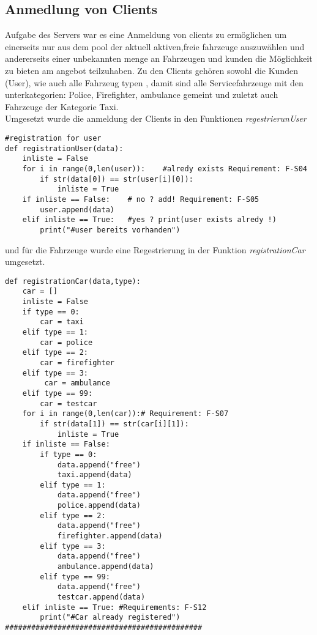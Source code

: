 \documentclass[conference]{IEEEtran}
\begin{document}
\subsection{Anmedlung von Clients}
Aufgabe des Servers war es eine Anmeldung von clients zu ermöglichen um  einerseits nur aus dem pool der aktuell aktiven,freie fahrzeuge  auszuwählen und andererseits einer unbekannten menge an Fahrzeugen und kunden die Möglichkeit zu bieten am angebot teilzuhaben. Zu den Clients gehören sowohl die Kunden (User), wie auch alle Fahrzeug typen , damit sind alle Servicefahrzeuge mit den unterkategorien: Police, Firefighter, ambulance gemeint und zuletzt auch Fahrzeuge der Kategorie Taxi.\\ 
Umgesetzt wurde die anmeldung der Clients in den Funktionen
\textit{regestrierunUser}
\begin{lstlisting}
#registration for user
def registrationUser(data):
    inliste = False
    for i in range(0,len(user)):    #alredy exists Requirement: F-S04
        if str(data[0]) == str(user[i][0]):
            inliste = True
    if inliste == False:    # no ? add! Requirement: F-S05
        user.append(data)
    elif inliste == True:   #yes ? print(user exists alredy !)
        print("#user bereits vorhanden")
\end{lstlisting}
und für die Fahrzeuge wurde eine Regestrierung in der Funktion \textit{registrationCar} umgesetzt.
\begin{lstlisting}
def registrationCar(data,type):
    car = []
    inliste = False
    if type == 0:
        car = taxi
    elif type == 1:
        car = police
    elif type == 2:
        car = firefighter
    elif type == 3:
         car = ambulance
    elif type == 99:
        car = testcar
    for i in range(0,len(car)):# Requirement: F-S07
        if str(data[1]) == str(car[i][1]):
            inliste = True
    if inliste == False:
        if type == 0:
            data.append("free")
            taxi.append(data)
        elif type == 1:
            data.append("free")
            police.append(data)
        elif type == 2:
            data.append("free")
            firefighter.append(data)
        elif type == 3:
            data.append("free")
            ambulance.append(data)
        elif type == 99:
            data.append("free")
            testcar.append(data)
    elif inliste == True: #Requirements: F-S12
        print("#Car already registered")
#############################################
\end{lstlisting}


\begin{thebibliography}{00}
\end{thebibliography}
\vspace{12pt}
\end{document}

